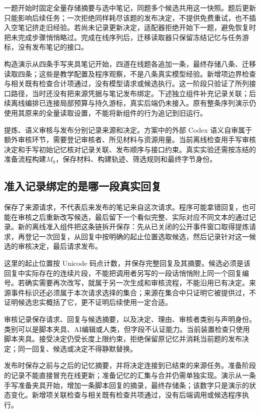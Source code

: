 一题开始时固定全量存储摘要与选中笔记，同题多个候选共用这一快照。题后更新只能影响后续任务；一次拒绝同样耗尽该题的发布决定，不提供免费重试，也不插入空笔记挤走旧经验。若尚未记录更新决定，适配器拒绝开始下一题，避免恢复时把未完成步骤悄悄略过。完成在线序列后，迁移读取器只保留冻结记忆与任务游标，没有发布笔记的接口。

构造演示从四条手写夹具笔记开始，四道在线题各追加一条，最终存储八条、迁移读取四条；这些是教学配置及程序观察，不是八条真实模型经验。新增项边界检查与相关既有检查合计项通过，没有模型请求或候选执行。这一阶段只验证了所列接口路径，当时还没有把来源凭据与笔记发布绑定。下述独立组件补充记录关联；后续离线编排已连接局部预算与持久游标，真实后端仍未接入。原有整条序列演示仍使用其原来的全量读取设置，不能将新组件的行为追记到旧运行。

提炼、语义审核与发布分别记录来源和决定。方案中的外部 Codex 语义自审属于额外审核环节，需要登记审核者、所见材料与资源用量。当前离线检查用手写审核决定和手写初始记忆核对记录关联、发布顺序与接口约束。真实实验还需按冻结的准备流程构建$M_0$，保存材料、构建轨迹、筛选规则和最终字节身份。

\subsection{准入记录绑定的是哪一段真实回复}

保存了来源请求，不代表后来发布的笔记来自这次请求。程序可能拿错回复，也可能在审核之后重新改写候选，最后留下一个看似完整、实际对应不同文本的通过记录。新的离线准入组件把这条链拆开保存：先从已关闭的公开事件窗口取得提炼请求，再登记一次回复，从回复中按明确的起止位置选取候选，然后记录针对这一候选的审核决定，最后请求发布。

这里的起止位置按 Unicode 码点计数，并保存完整回复及其摘要。候选必须是该回复中实际存在的连续片段，不能把调用者另写的一段话悄悄附上同一个回复编号。若确实需要再次改写，就属于另一次生成和审核流程，不能沿用已有决定。来源事件标识还必须属于本次请求选择的集合；来源在集合中只证明它被提供过，不证明候选忠实概括了它，更不证明后续使用一定合适。

审核记录保存请求、回复与候选摘要，以及决定、理由、审核者类别与声明身份。类别可以是脚本夹具、AI编辑或人类，但字段不认证能力。当前装置检查只使用脚本夹具。接受决定仍受长度上限约束，拒绝保留原记忆并消耗当前题的发布决定；同一回复、候选或决定不得静默替换。

发布时保存之前与之后的记忆摘要，并将决定连接到已结束的来源任务。准备阶段的记录不能直接冒充在线更新；准备记忆的汇集与合并仍需单独实现。演示从一条手写准备夹具开始，增加一条脚本回复的摘录，最终存储条；该数字只是演示的状态变化。新增项关联检查与相关既有检查共项通过，没有后端调用或候选程序执行。

